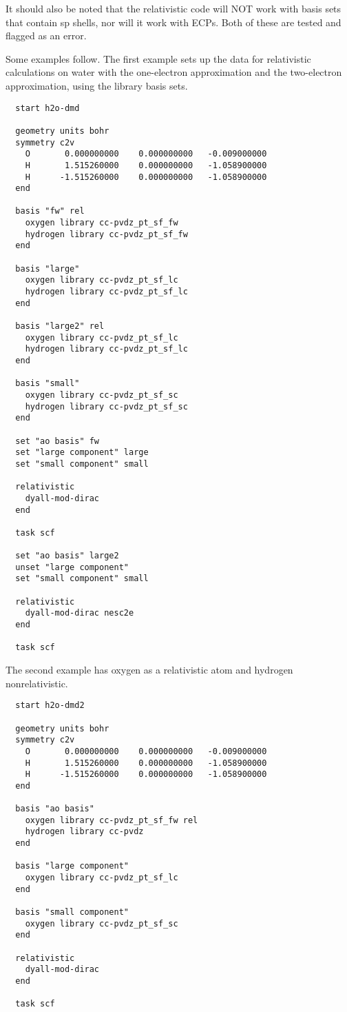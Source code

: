 It should also be noted that the relativistic code will NOT work with basis
sets that contain sp shells, nor will it work with ECPs. Both of these are
tested and flagged as an error.

Some examples follow. The first example sets up the data for relativistic
calculations on water with the one-electron approximation and the
two-electron approximation, using the library basis sets.

\begin{verbatim}
  start h2o-dmd

  geometry units bohr
  symmetry c2v
    O       0.000000000    0.000000000   -0.009000000
    H       1.515260000    0.000000000   -1.058900000
    H      -1.515260000    0.000000000   -1.058900000
  end

  basis "fw" rel
    oxygen library cc-pvdz_pt_sf_fw
    hydrogen library cc-pvdz_pt_sf_fw
  end

  basis "large"
    oxygen library cc-pvdz_pt_sf_lc
    hydrogen library cc-pvdz_pt_sf_lc
  end

  basis "large2" rel
    oxygen library cc-pvdz_pt_sf_lc
    hydrogen library cc-pvdz_pt_sf_lc
  end

  basis "small"
    oxygen library cc-pvdz_pt_sf_sc
    hydrogen library cc-pvdz_pt_sf_sc
  end

  set "ao basis" fw
  set "large component" large
  set "small component" small

  relativistic
    dyall-mod-dirac
  end

  task scf

  set "ao basis" large2
  unset "large component"
  set "small component" small

  relativistic
    dyall-mod-dirac nesc2e
  end

  task scf
\end{verbatim}

The second example has oxygen as a relativistic atom and hydrogen nonrelativistic.

\begin{verbatim}
  start h2o-dmd2

  geometry units bohr
  symmetry c2v
    O       0.000000000    0.000000000   -0.009000000
    H       1.515260000    0.000000000   -1.058900000
    H      -1.515260000    0.000000000   -1.058900000
  end

  basis "ao basis"
    oxygen library cc-pvdz_pt_sf_fw rel
    hydrogen library cc-pvdz
  end

  basis "large component"
    oxygen library cc-pvdz_pt_sf_lc
  end

  basis "small component"
    oxygen library cc-pvdz_pt_sf_sc
  end

  relativistic
    dyall-mod-dirac
  end

  task scf
\end{verbatim}
